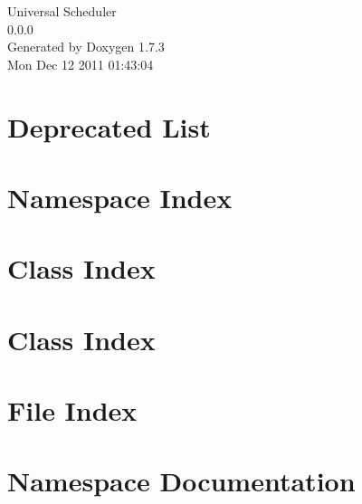 \documentclass[a4paper]{book}
\begin{document}
\hypersetup{pageanchor=false}
\begin{titlepage}
\vspace*{7cm}
\begin{center}
{\Large Universal Scheduler \\[1ex]\large 0.0.0 }\\
\vspace*{1cm}
{\large Generated by Doxygen 1.7.3}\\
\vspace*{0.5cm}
{\small Mon Dec 12 2011 01:43:04}\\
\end{center}
\end{titlepage}
\clearemptydoublepage
{}
\tableofcontents
\clearemptydoublepage
{}
\hypersetup{pageanchor=true}
\chapter{Deprecated List}
\label{deprecated}
\hypertarget{deprecated}{}

\chapter{Namespace Index}

\chapter{Class Index}

\chapter{Class Index}

\chapter{File Index}

\chapter{Namespace Documentation}






\end{document}

